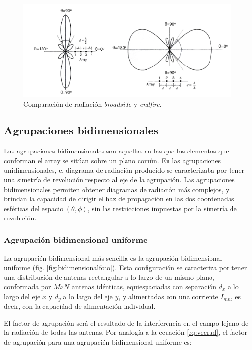 \begin{figure}[h]
    \centering
        \includegraphics[width=\textwidth]{archivos/array/side}
        \caption{Comparación de radiación \textit{broadside} y \textit{endfire}.}
        \label{fig:side}
\end{figure}

\subsection{Agrupaciones bidimensionales}
\par Las agrupaciones bidimensionales son aquellas en las que los elementos que conforman el array se sitúan sobre un plano común. En las agrupaciones unidimensionales, el diagrama de radiación producido se caracterizaba por tener una simetría de revolución respecto al eje de la agrupación. Las agrupaciones bidimensionales permiten obtener diagramas de radiación más complejos, y brindan la capacidad de dirigir el haz de propagación en las dos coordenadas esféricas del espacio $(\theta, \phi)$, sin las restricciones impuestas por la simetría de revolución. \cite{Cardama2002}
\\
\subsubsection{Agrupación bidimensional uniforme}
\par La agrupación bidimensional más sencilla es la agrupación bidimensional uniforme (fig. \ref{fig:bidimensionalfoto}). Esta configuración se caracteriza por tener una distribución de antenas rectangular a lo largo de un mismo plano, conformada por $MxN$ antenas idénticas, equiespaciadas con separación $d_{x}$ a lo largo del eje $x$ y $d_{y}$ a lo largo del eje $y$, y alimentadas con una corriente $I_{mn}$, es decir, con la capacidad de alimentación individual. 
\\
\par El factor de agrupación será el resultado de la interferencia en el campo lejano de la radiación de todas las antenas. Por analogía a la ecuación \ref{eq:vecrad}, el factor de agrupación para una agrupación bidimensional uniforme es: 

